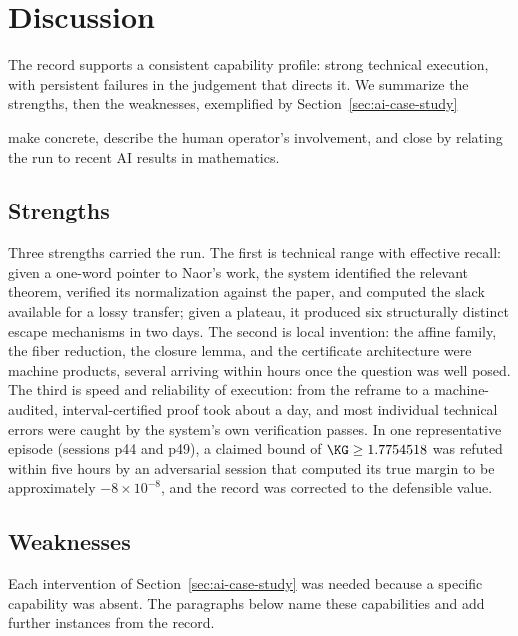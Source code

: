 \section{Discussion}
\label{sec:ai-discussion}

The record supports a consistent capability profile: strong technical
execution, with persistent failures in the judgement that directs it. We
summarize the strengths, then the weaknesses, exemplified by Section~\ref{sec:ai-case-study} 

make concrete, describe
the human operator's involvement, and close by relating the run to recent
AI results in mathematics.

\subsection{Strengths}

Three strengths carried the run. The first is technical range with effective
recall: given a one-word pointer to Naor's work, the system identified the
relevant theorem, verified its normalization against the paper, and computed
the slack available for a lossy transfer; given a plateau, it produced six
structurally distinct escape mechanisms in two days. The second is local
invention: the affine family, the fiber reduction, the closure lemma, and
the certificate architecture were machine products, several arriving within
hours once the question was well posed. The third is speed and reliability
of execution: from the reframe to a machine-audited, interval-certified
proof took about a day, and most individual technical errors were caught by
the system's own verification passes. In one representative episode
(sessions p44 and p49), a claimed bound of $\KG\ge1.7754518$
was refuted within five hours by an adversarial session that computed its
true margin to be approximately $-8\times10^{-8}$, and the record was
corrected to the defensible value.

\subsection{Weaknesses}

Each intervention of Section~\ref{sec:ai-case-study} was needed because a
specific capability was absent. The paragraphs below name these
capabilities and add further instances from the record.

